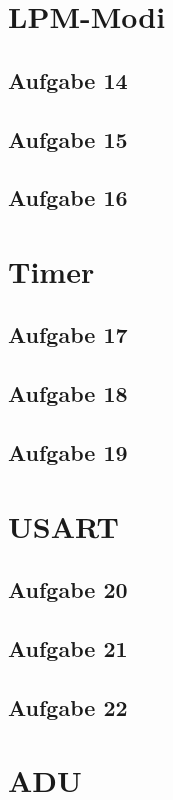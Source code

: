 \documentclass[11pt,a4paper,onecolumn]{report}
\begin{document}
\chapter{LPM-Modi}

\section{Aufgabe 14}
\section{Aufgabe 15}
\section{Aufgabe 16}

\chapter{Timer}

\section{Aufgabe 17}
\section{Aufgabe 18}
\section{Aufgabe 19}

\chapter{USART}

\section{Aufgabe 20}
\section{Aufgabe 21}
\section{Aufgabe 22}

\chapter{ADU}
\end{document}

